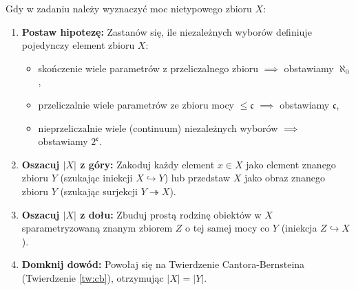 \documentclass[11pt, a4paper]{article}
\theoremstyle{definition}
\theoremstyle{plain}
\theoremstyle{remark}
\begin{document}
Gdy w zadaniu należy wyznaczyć moc nietypowego zbioru $X$:
\begin{enumerate}
    \item \textbf{Postaw hipotezę:} Zastanów się, ile niezależnych wyborów definiuje pojedynczy element zbioru $X$:
    \begin{itemize}
        \item skończenie wiele parametrów z przeliczalnego zbioru $\implies$ obstawiamy $\aleph_0$,
        \item przeliczalnie wiele parametrów ze zbioru mocy $\le \mathfrak{c}$ $\implies$ obstawiamy $\mathfrak{c}$,
        \item nieprzeliczalnie wiele (continuum) niezależnych wyborów $\implies$ obstawiamy $2^{\mathfrak{c}}$.
    \end{itemize}
    \item \textbf{Oszacuj $|X|$ z góry:} Zakoduj każdy element $x \in X$ jako element znanego zbioru $Y$ (szukając iniekcji $X \hookrightarrow Y$) lub przedstaw $X$ jako obraz znanego zbioru $Y$ (szukając surjekcji $Y \twoheadrightarrow X$).
    \item \textbf{Oszacuj $|X|$ z dołu:} Zbuduj prostą rodzinę obiektów w $X$ sparametryzowaną znanym zbiorem $Z$ o tej samej mocy co $Y$ (iniekcja $Z \hookrightarrow X$).
    \item \textbf{Domknij dowód:} Powołaj się na Twierdzenie Cantora-Bernsteina (Twierdzenie \ref{tw:cb}), otrzymując $|X| = |Y|$.
\end{enumerate}
\end{document}
